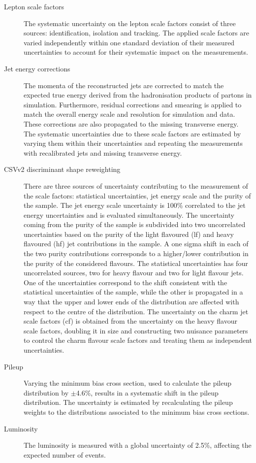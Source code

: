 \begin{description}
  		\item[Lepton scale factors] The systematic uncertainty on the lepton scale factors consist of three sources: identification, isolation and tracking.	The applied scale factors are varied independently within one standard deviation of their measured uncertainties to account for their systematic impact on the measurements. 

	\item[Jet energy corrections] The momenta of the reconstructed jets are corrected to match the expected true energy derived from the hadronisation products of partons in simulation. Furthermore, residual corrections and smearing is applied to match the overall energy scale and resolution for simulation and data. These corrections are also propagated to the missing transverse energy. The systematic uncertainties due to these scale factors are estimated by varying them within their uncertainties and repeating the measurements with recalibrated jets and missing transverse energy. 
	

	
	\item[CSVv2 discriminant shape reweighting] There are three sources of uncertainty contributing to the measurement of the scale factors: statistical uncertainties, jet energy scale and the purity of the sample. The jet energy scale uncertainty is 100\% correlated to the jet energy uncertainties and is evaluated simultaneously. The uncertainty coming from the purity of the sample is subdivided into two uncorrelated uncertainties based on the purity of the light flavoured (lf) and heavy flavoured (hf) jet contributions in the sample. A one sigma shift in each of the two purity contributions corresponds to a higher/lower contribution in the purity of the considered flavours. The statistical uncertainties has four uncorrelated sources, two for heavy flavour and two for light flavour jets. One of the uncertainties correspond to the shift consistent with the statistical uncertainties of the sample, while the other is propagated in a way that the upper and lower ends of the distribution are affected with respect to the centre of the distribution.   The uncertainty on the charm jet scale factors (cf)   is obtained from the uncertainty on the heavy flavour scale factors, doubling it in size and constructing two nuisance parameters to control the charm flavour scale factors and treating them as independent uncertainties. 
	
	
		\item[Pileup] Varying the minimum bias cross section, used to calculate the pileup distribution by $\pm$4.6\%, results in a systematic shift in the pileup distribution. The uncertainty is estimated by recalculating the pileup weights to the distributions associated to the minimum bias cross sections. 
		
		
		\item[Luminosity] The luminosity  is measured with a global uncertainty of 2.5\%, affecting the expected number of events. 
	
\end{description}

